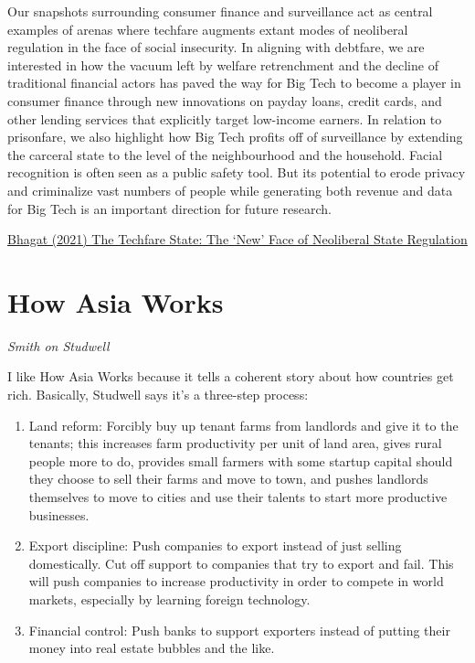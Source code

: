 \documentclass[
]{book}
\begin{document}
Our snapshots surrounding consumer finance and surveillance act as central examples of arenas where techfare augments extant modes of neoliberal regulation in the face of social insecurity. In aligning with debtfare, we are interested in how the vacuum left by welfare retrenchment and the decline of traditional financial actors has paved the way for Big Tech to become a player in consumer finance through new innovations on payday loans, credit cards, and other lending services that explicitly target low-income earners. In relation to prisonfare, we also highlight how Big Tech profits off of surveillance by extending the carceral state to the level of the neighbourhood and the household. Facial recognition is often seen as a public safety tool. But its potential to erode privacy and criminalize vast numbers of people while generating both revenue and data for Big Tech is an important direction for future research.

\href{https://developingeconomics.org/2021/06/15/the-techfare-state-the-new-face-of-neoliberal-state-regulation/}{Bhagat (2021) The Techfare State: The `New' Face of Neoliberal State Regulation}

\hypertarget{how-asia-works}{%
\section{How Asia Works}\label{how-asia-works}}

\emph{Smith on Studwell}

I like How Asia Works because it tells a coherent story about how countries get rich. Basically, Studwell says it's a three-step process:

\begin{enumerate}
\def\labelenumi{\arabic{enumi}.}
\item
  Land reform: Forcibly buy up tenant farms from landlords and give it to the tenants; this increases farm productivity per unit of land area, gives rural people more to do, provides small farmers with some startup capital should they choose to sell their farms and move to town, and pushes landlords themselves to move to cities and use their talents to start more productive businesses.
\item
  Export discipline: Push companies to export instead of just selling domestically. Cut off support to companies that try to export and fail. This will push companies to increase productivity in order to compete in world markets, especially by learning foreign technology.
\item
  Financial control: Push banks to support exporters instead of putting their money into real estate bubbles and the like.
\end{enumerate}
\end{document}
